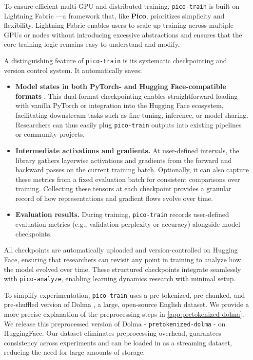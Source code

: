 To ensure efficient multi-GPU and distributed training, \texttt{pico-train} is built on Lightning Fabric \citep{lightning-fabric}—a framework that, like \textbf{Pico}, prioritizes simplicity and flexibility. Lightning Fabric enables users to scale up training across multiple GPUs or nodes without introducing excessive abstractions and ensures that the core training logic remains easy to understand and modify.

A distinguishing feature of \texttt{pico-train} is its systematic checkpointing and version control system. It automatically saves:
\begin{itemize}
    \item \textbf{Model states in both PyTorch- and Hugging Face-compatible formats} \citep{huggingface}. This dual-format checkpointing enables straightforward loading with vanilla PyTorch or integration into the Hugging Face ecosystem, facilitating downstream tasks such as fine-tuning, inference, or model sharing. Researchers can thus easily plug \texttt{pico-train} outputs into existing pipelines or community projects.

    \item \textbf{Intermediate activations and gradients.} At user-defined intervals, the library gathers layerwise activations and gradients from the forward and backward passes on the current training batch. Optionally, it can also capture these metrics from a fixed evaluation batch for consistent comparisons over training. Collecting these tensors at each checkpoint provides a granular record of how representations and gradient flows evolve over time.

    \item \textbf{Evaluation results.} During training, \texttt{pico-train} records user-defined evaluation metrics (e.g., validation perplexity or accuracy) alongside model checkpoints.
\end{itemize}
\vspace{-0.2em}
All checkpoints are automatically uploaded and version-controlled on Hugging Face, ensuring that researchers can revisit any point in training to analyze how the model evolved over time. These structured checkpoints integrate seamlessly with \texttt{pico-analyze}, enabling learning dynamics research with minimal setup.

To simplify experimentation, \texttt{pico-train} uses a pre-tokenized, pre-chunked, and pre-shuffled version of Dolma \citep{soldaini2024dolma}, a large, open-source English dataset. We provide a more precise explanation of the preprocessing steps in \cref{app:pretokenized-dolma}. We release this preprocessed version of Dolma - \texttt{pretokenized-dolma} - on HuggingFace. Our dataset eliminates preprocessing overhead, guarantees consistency across experiments and can be loaded in as a streaming dataset, reducing the need for large amounts of storage.

